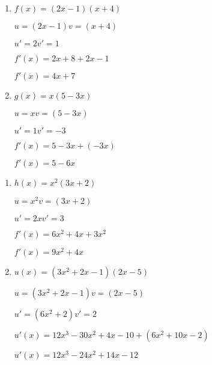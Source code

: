 \documentclass[12pt,a4paper]{article}
\begin{document}
\begin{center}
        \shadowbox{\begin{large}
                \textcolor{black}{17p239 }
        \end{large}}
    \end{center}
    \vspace{0.5 cm}

\begin{enumerate}
	\item	$f(x) = (2x-1)(x+4)$\par
			$u =		(2x-1)		v =		(x+4)$\par
			$u' =	2 			v' =	1	$\par
	$f'(x) = 2x+8 + 2x-1$\par
	$f'(x) = 4x+7$\par
    \vspace{0.5 cm}
	\item	$g(x) = x(5-3x)$\par
             $u =   x           v = (5-3x)    $\par
             $u' =   1           v' =   -3   $\par
     $f'(x) = 5-3x + (-3x)$\par
     $f'(x) = 5 - 6x$\par

\end{enumerate}

\begin{center}
        \shadowbox{\begin{large}
                \textcolor{black}{34p240 }
        \end{large}}
    \end{center}
    \vspace{0.5 cm}
\begin{enumerate}
     \item   $h(x) = x^2(3x+2)$\par
             $u =     x^2      v =     (3x+2)$\par
             $u' =   2x           v' =    3   $\par
     $f'(x) = 6x^2+4x + 3x^2$\par
     $f'(x) = 9x^2+4x$\par
     \vspace{0.5 cm}
     \item   $u(x) = (3x^2+2x-1)(2x-5)$\par
              $u =    (3x^2+2x-1) v = (2x-5)    $\par
              $u' =   (6x^2+2)    v' = 2   $\par
      $u'(x) = 12x^3 - 30x^2 + 4x - 10 + (6x^2 + 10x - 2)$\par
      $u'(x) = 12x^3 - 24x^2 + 14x - 12$\par
      
 \end{enumerate}
\end{document}
